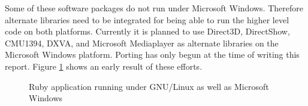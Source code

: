 \documentclass[a4paper,12pt]{book}
\begin{document}
Some of these software packages do not run under Microsoft Windows. Therefore
alternate libraries need to be integrated for being able to run the
higher level code on both platforms. Currently it is planned to
use Direct3D, DirectShow, CMU1394, DXVA, and Microsoft Mediaplayer as alternate
libraries on the Microsoft Windows platform. Porting has only
begun at the time of writing this report. Figure \ref{fig:platforms} shows an
early result of these efforts.
\begin{figure}[htbp]
   \begin{center}
     \begin{minipage}[c]{.45\textwidth}
     \end{minipage}
     \begin{minipage}[c]{.45\textwidth}
     \end{minipage}
     \caption{Ruby application running under GNU/Linux as well as Microsoft Windows\label{fig:platforms}}
   \end{center}
\end{figure}

\end{document}
